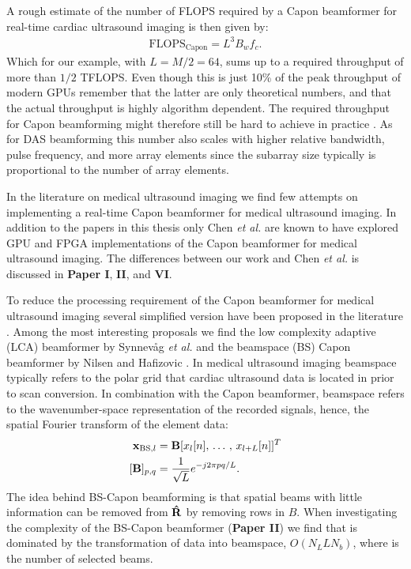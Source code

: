 A rough estimate of the number of FLOPS required by a Capon beamformer for real-time cardiac ultrasound imaging is then given by:
\begin{align}
\text{FLOPS}_{\text{Capon}} = L^3B_wf_c.
\end{align}
Which for our example, with $L=M/2=64$, sums up to a required throughput of more than $1/2$ TFLOPS. Even though this is just 10\% of the peak throughput of modern GPUs remember that the latter are only theoretical numbers, and that the actual throughput is highly algorithm dependent. The required throughput for Capon beamforming might therefore still be hard to achieve in practice \cite[\textbf{Paper II}]{So2011}. As for DAS beamforming this number also scales with higher relative bandwidth, pulse frequency, and more array elements since the subarray size typically is proportional to the number of array elements. 

In the literature on medical ultrasound imaging we find few attempts on implementing a real-time Capon beamformer for medical ultrasound imaging. In addition to the papers in this thesis only Chen \textit{et al.} \cite{Chen2011, Chen, Chen2011a} are known to have explored GPU and FPGA implementations of the Capon beamformer for medical ultrasound imaging. The differences between our work and Chen \textit{et al.} is discussed in \textbf{Paper I}, \textbf{II}, and \textbf{VI}.

To reduce the processing requirement of the Capon beamformer for medical ultrasound imaging several simplified version have been proposed in the literature \cite{Asl2012, Kim}. Among the most interesting proposals we find the low complexity adaptive (LCA) beamformer by Synnev\aa{}g \textit{et al.} \cite{Synnevag2011} and the beamspace (BS) Capon beamformer by Nilsen and Hafizovic \cite{Nilsen2009}. In medical ultrasound imaging beamspace typically refers to the polar grid that cardiac ultrasound data is located in prior to scan conversion. In combination with the Capon beamformer, beamspace refers to the wavenumber-space representation of the recorded signals, hence, the spatial Fourier transform of the element data: 
\begin{align}
\vec{x}_{\text{BS},l} &= \mat{B}[x_l[n],\,\dotso,\,x_{l+L}[n]]^T\\
[\mat{B}]_{p,q} &= \frac{1}{\sqrt{L}}e^{-j 2 \pi p q / L}.
\end{align}
The idea behind BS-Capon beamforming is that spatial beams with little information can be removed from $\mathbf{\hat{R}}$ by removing rows in $B$. When investigating the complexity of the BS-Capon beamformer (\textbf{Paper II}) we find that is dominated by the transformation of data into beamspace, $O(N_LLN_b)$, where  is the number of selected beams. 

